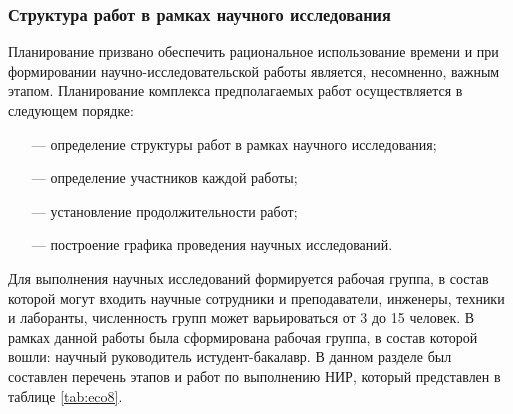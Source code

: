 \subsubsection{Структура работ в рамках научного исследования} \label{eco.2.1}

Планирование  призвано  обеспечить  рациональное  использование времени  и  при  формировании  научно-исследовательской  работы  является, несомненно,  важным  этапом.  Планирование  комплекса  предполагаемых работ осуществляется в следующем порядке:

 \begin{itemize}[leftmargin=1.6\parindent, wide]
 	\item[---] определение структуры работ в рамках научного исследования;
 		\item[---] определение участников каждой работы;
 			\item[---] установление продолжительности работ;
 				\item[---] построение графика проведения научных исследований.
 \end{itemize}
 
Для выполнения научных исследований формируется рабочая группа, в состав  которой  могут  входить  научные  сотрудники  и  преподаватели, инженеры, техники и лаборанты, численность групп может варьироваться от 3  до  15  человек.  В  рамках  данной  работы  была  сформирована  рабочая группа, в состав которой вошли: научный руководитель истудент-бакалавр. В  данном  разделе  был  составлен  перечень  этапов  и  работ  по  выполнению НИР, который представлен в таблице \ref{tab:eco8}.

